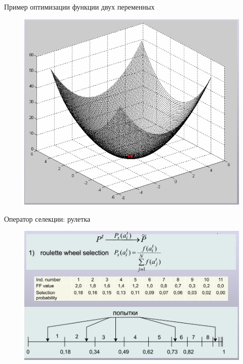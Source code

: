 \documentclass{beamer}
\begin{document}
\begin{frame}{Пример оптимизации функции двух переменных}
\begin{figure}[h]
\centering
\includegraphics[scale=0.4]{images/lec04-pic20.png}
\end{figure}
\end{frame}

\begin{frame}{Оператор селекции: рулетка}
\begin{figure}[h]
\centering
\includegraphics[scale=0.4]{images/lec04-pic21.png}
\end{figure}
\end{frame}
\end{document}
